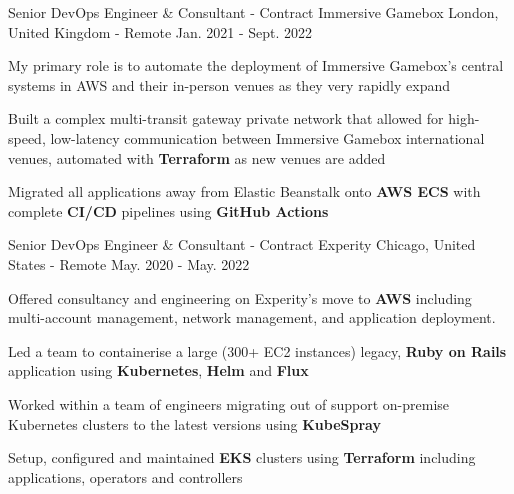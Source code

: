 
\begin{cventries}

  \cventry
    {Senior DevOps Engineer \& Consultant - Contract} %
    {Immersive Gamebox} %
    {London, United Kingdom - Remote} %
    {Jan. 2021 - Sept. 2022} %
    {
      \begin{cvitems} %
        \item {My primary role is to automate the deployment of Immersive Gamebox’s central systems in AWS and their in-person venues as they very rapidly expand}
        \item {Built a complex multi-transit gateway private network that allowed for high-speed, low-latency communication between Immersive Gamebox international venues, automated with \textbf{Terraform} as new venues are added}
        \item {Migrated all applications away from Elastic Beanstalk onto \textbf{AWS ECS} with complete \textbf{CI/CD} pipelines using \textbf{GitHub Actions}}
      \end{cvitems}
    }

  \cventry
    {Senior DevOps Engineer \& Consultant - Contract} %
    {Experity} %
    {Chicago, United States - Remote} %
    {May. 2020 - May. 2022} %
    {
      \begin{cvitems} %
        \item {Offered consultancy and engineering on Experity's move to \textbf{AWS} including multi-account management, network management, and application deployment.}
        \item {Led a team to containerise a large (300+ EC2 instances) legacy, \textbf{Ruby on Rails} application using \textbf{Kubernetes}, \textbf{Helm} and \textbf{Flux}}
        \item {Worked within a team of engineers migrating out of support on-premise Kubernetes clusters to the latest versions using \textbf{KubeSpray}}
        \item {Setup, configured and maintained \textbf{EKS} clusters using \textbf{Terraform} including applications, operators and controllers}
      \end{cvitems}
    }


\end{cventries}

